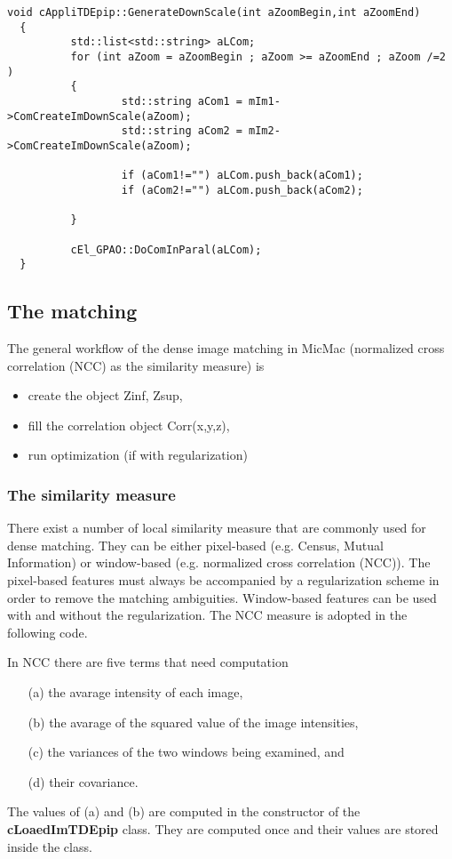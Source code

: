 \begin{lstlisting}
void cAppliTDEpip::GenerateDownScale(int aZoomBegin,int aZoomEnd)
  {
          std::list<std::string> aLCom;
          for (int aZoom = aZoomBegin ; aZoom >= aZoomEnd ; aZoom /=2 )
          {
                  std::string aCom1 = mIm1->ComCreateImDownScale(aZoom);
                  std::string aCom2 = mIm2->ComCreateImDownScale(aZoom);
  
                  if (aCom1!="") aLCom.push_back(aCom1);
                  if (aCom2!="") aLCom.push_back(aCom2);
  
          }
  
          cEl_GPAO::DoComInParal(aLCom);
  }
\end{lstlisting}



\subsection{The matching}\label{subsection:match} 
The general workflow of the dense image matching in MicMac (normalized cross correlation (NCC) as the similarity measure) is
\begin{itemize}
  \item create the object Zinf, Zsup,
  \item fill the correlation object Corr(x,y,z),
  \item run optimization (if with regularization)
\end{itemize}

\subsubsection{The similarity measure}
There exist a number of local similarity measure that are commonly used for dense matching. They can be either pixel-based (e.g. Census, Mutual Information) or window-based (e.g. normalized cross correlation (NCC)). The pixel-based features must always be accompanied by a regularization scheme in order to remove the matching ambiguities. Window-based features can be used with and without the regularization. The NCC measure is adopted in the following code.\newline

\noindent In NCC there are five terms that need computation 
\begin{itemize}
  \item[(a)] the avarage intensity of each image,
  \item[(b)] the avarage of the squared value of the image intensities,
  \item[(c)] the variances of the two windows being examined, and
  \item[(d)] their covariance.\newline
\end{itemize}
\noindent The values of (a) and (b) are computed in the constructor of the \textbf{cLoaedImTDEpip} class. They are computed once and their values are stored inside the class.



